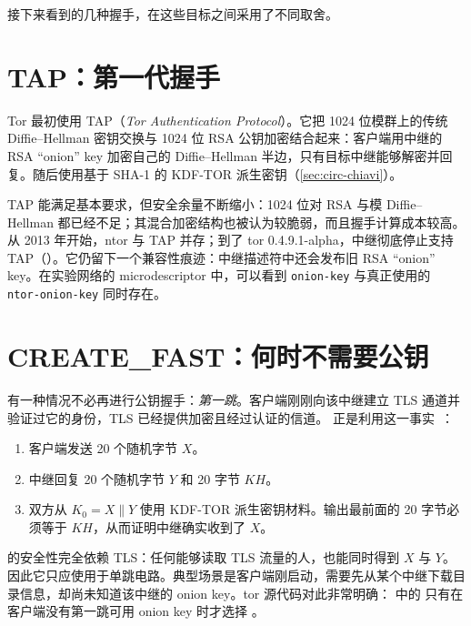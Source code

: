 接下来看到的几种握手，在这些目标之间采用了不同取舍。

\section{TAP：第一代握手}\label{sec:tap}

Tor 最初使用 TAP（\emph{Tor Authentication Protocol}）。它把 1024 位模群上的传统 Diffie--Hellman 密钥交换与 1024 位 RSA 公钥加密结合起来：客户端用中继的 RSA \enquote{onion} key 加密自己的 Diffie--Hellman 半边，只有目标中继能够解密并回复。随后使用基于 SHA-1 的 KDF-TOR 派生密钥（\cref{sec:circ-chiavi}）。

TAP 能满足基本要求，但安全余量不断缩小：1024 位对 RSA 与模 Diffie--Hellman 都已经不足；其混合加密结构也被认为较脆弱，而且握手计算成本较高。从 2013 年开始，ntor 与 TAP 并存；到了 tor 0.4.9.1-alpha，中继彻底停止支持 TAP（）。它仍留下一个兼容性痕迹：中继描述符中还会发布旧 RSA \enquote{onion} key。在实验网络的 microdescriptor 中，可以看到 \texttt{onion-key} 与真正使用的 \texttt{ntor-onion-key} 同时存在。

\section{CREATE\_FAST：何时不需要公钥}\label{sec:create-fast}

有一种情况不必再进行公钥握手：\emph{第一跳}。客户端刚刚向该中继建立 TLS 通道并验证过它的身份，TLS 已经提供加密且经过认证的信道。 正是利用这一事实~：
\begin{enumerate}
  \item 客户端发送 20 个随机字节 $X$。
  \item 中继回复 20 个随机字节 $Y$ 和 20 字节 $KH$。
  \item 双方从 $K_0 = X \| Y$ 使用 KDF-TOR 派生密钥材料。输出最前面的 20 字节必须等于 $KH$，从而证明中继确实收到了 $X$。
\end{enumerate}

 的安全性完全依赖 TLS：任何能够读取 TLS 流量的人，也能同时得到 $X$ 与 $Y$。因此它只应使用于单跳电路。典型场景是客户端刚启动，需要先从某个中继下载目录信息，却尚未知道该中继的 onion key。tor 源代码对此非常明确： 中的  只有在客户端没有第一跳可用 onion key 时才选择 。

